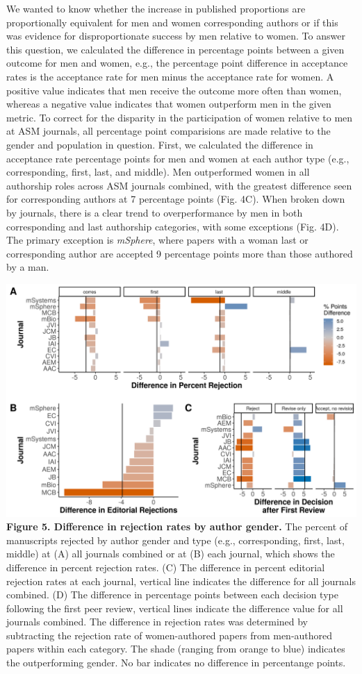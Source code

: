 \documentclass[11pt,]{article}
\begin{document}
We wanted to know whether the increase in published proportions are
proportionally equivalent for men and women corresponding authors or if
this was evidence for disproportionate success by men relative to women.
To answer this question, we calculated the difference in percentage
points between a given outcome for men and women, e.g., the percentage
point difference in acceptance rates is the acceptance rate for men
minus the acceptance rate for women. A positive value indicates that men
receive the outcome more often than women, whereas a negative value
indicates that women outperform men in the given metric. To correct for
the disparity in the participation of women relative to men at ASM
journals, all percentage point comparisions are made relative to the
gender and population in question. First, we calculated the difference
in acceptance rate percentage points for men and women at each author
type (e.g., corresponding, first, last, and middle). Men outperformed
women in all authorship roles across ASM journals combined, with the
greatest difference seen for corresponding authors at 7 percentage
points (Fig. 4C). When broken down by journals, there is a clear trend
to overperformance by men in both corresponding and last authorship
categories, with some exceptions (Fig. 4D). The primary exception is
\emph{mSphere}, where papers with a woman last or corresponding author
are accepted 9 percentage points more than those authored by a man.

\includegraphics{Figure_5.png} \textbf{Figure 5. Difference in rejection
rates by author gender.} The percent of manuscripts rejected by author
gender and type (e.g., corresponding, first, last, middle) at (A) all
journals combined or at (B) each journal, which shows the difference in
percent rejection rates. (C) The difference in percent editorial
rejection rates at each journal, vertical line indicates the difference
for all journals combined. (D) The difference in percentage points
between each decision type following the first peer review, vertical
lines indicate the difference value for all journals combined. The
difference in rejection rates was determined by subtracting the
rejection rate of women-authored papers from men-authored papers within
each category. The shade (ranging from orange to blue) indicates the
outperforming gender. No bar indicates no difference in percentange
points.
\end{document}
